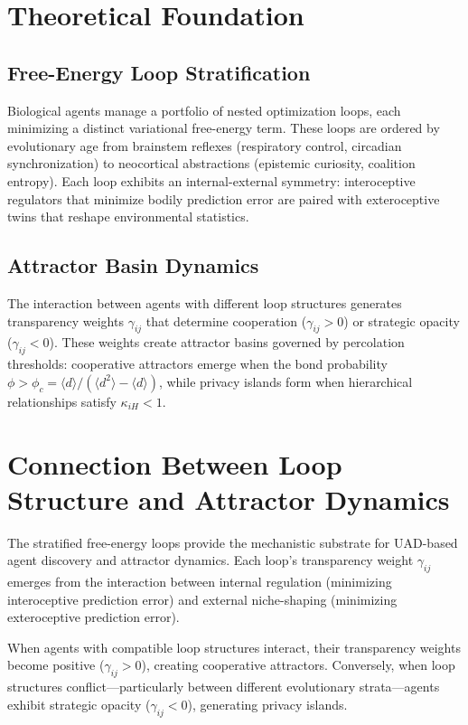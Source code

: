 \documentclass[10pt,conference]{IEEEtran}
\begin{document}
\section{Theoretical Foundation}

\subsection{Free-Energy Loop Stratification}

Biological agents manage a portfolio of nested optimization loops, each minimizing a distinct variational free-energy term. These loops are ordered by evolutionary age from brainstem reflexes (respiratory control, circadian synchronization) to neocortical abstractions (epistemic curiosity, coalition entropy). Each loop exhibits an internal-external symmetry: interoceptive regulators that minimize bodily prediction error are paired with exteroceptive twins that reshape environmental statistics.

\subsection{Attractor Basin Dynamics}

The interaction between agents with different loop structures generates transparency weights $\gamma_{ij}$ that determine cooperation ($\gamma_{ij} > 0$) or strategic opacity ($\gamma_{ij} < 0$). These weights create attractor basins governed by percolation thresholds: cooperative attractors emerge when the bond probability $\phi > \phi_c = \langle d \rangle/(\langle d^2 \rangle - \langle d \rangle)$, while privacy islands form when hierarchical relationships satisfy $\kappa_{iH} < 1$.

\section{Connection Between Loop Structure and Attractor Dynamics}

The stratified free-energy loops provide the mechanistic substrate for UAD-based agent discovery and attractor dynamics. Each loop's transparency weight $\gamma_{ij}$ emerges from the interaction between internal regulation (minimizing interoceptive prediction error) and external niche-shaping (minimizing exteroceptive prediction error).

When agents with compatible loop structures interact, their transparency weights become positive ($\gamma_{ij} > 0$), creating cooperative attractors. Conversely, when loop structures conflict—particularly between different evolutionary strata—agents exhibit strategic opacity ($\gamma_{ij} < 0$), generating privacy islands.
\end{document}

